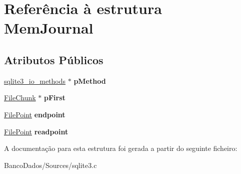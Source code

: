 \hypertarget{struct_mem_journal}{\section{Referência à estrutura Mem\-Journal}
\label{struct_mem_journal}
}
\subsection*{Atributos Públicos}
\begin{DoxyCompactItemize}
\item 
\hypertarget{struct_mem_journal_a00c1523cce1bcfadc2b672b8703a78cb}{\hyperlink{structsqlite3__io__methods}{sqlite3\-\_\-io\-\_\-methods} $\ast$ {\bfseries p\-Method}}\label{struct_mem_journal_a00c1523cce1bcfadc2b672b8703a78cb}

\item 
\hypertarget{struct_mem_journal_ade7a6dea7b38a8a86f33476ae207765f}{\hyperlink{struct_file_chunk}{File\-Chunk} $\ast$ {\bfseries p\-First}}\label{struct_mem_journal_ade7a6dea7b38a8a86f33476ae207765f}

\item 
\hypertarget{struct_mem_journal_ac69637f95cfbce175cbeef00f71e59a9}{\hyperlink{struct_file_point}{File\-Point} {\bfseries endpoint}}\label{struct_mem_journal_ac69637f95cfbce175cbeef00f71e59a9}

\item 
\hypertarget{struct_mem_journal_a5645d38e1a488b62b5f63112628bf472}{\hyperlink{struct_file_point}{File\-Point} {\bfseries readpoint}}\label{struct_mem_journal_a5645d38e1a488b62b5f63112628bf472}

\end{DoxyCompactItemize}


A documentação para esta estrutura foi gerada a partir do seguinte ficheiro\-:\begin{DoxyCompactItemize}
\item 
Banco\-Dados/\-Sources/sqlite3.\-c\end{DoxyCompactItemize}
